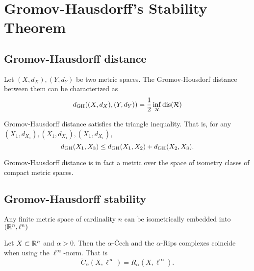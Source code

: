 \chapter{Gromov-Hausdorff's Stability Theorem}

\section{Gromov-Hausdorff distance}

\begin{definition}
    
\end{definition}

\begin{definition}
    
\end{definition}

\begin{proposition}
    Let $ (X, d_X), (Y, d_Y) $ be two metric spaces. The Gromov-Housdorf distance between them can be characterized as
    $$
        d_{\operatorname{GH}}((X, d_X), (Y, d_Y)) = \frac{1}{2} \inf_{\mathcal R} \operatorname{dis}(\mathcal R)
    $$  
\end{proposition}

\begin{lemma}
    Gromov-Hausdorff distance satisfies the triangle inequality. That is, for any $ (X_1, d_{X_1}), (X_1, d_{X_1}), (X_1, d_{X_1}) $,
    $$
        d_{\operatorname{GH}}(X_1, X_3) \leq d_{\operatorname{GH}}(X_1, X_2) + d_{\operatorname{GH}}(X_2, X_3).
    $$
\end{lemma}

\begin{theorem}
    Gromov-Hausdorff distance is in fact a metric over the space of isometry clases of compact metric spaces.    
\end{theorem}

\section{Gromov-Hausdorff stability}
\begin{lemma}
    Any finite metric space of cardinality $ n $ can be isometrically embedded into $(\mathbb R^n, \ell^n)$
\end{lemma}

\begin{lemma}
    Let $ X \subset \mathbb R^n $ and $ \alpha > 0 $. Then the $\alpha$-\v Cech and the $\alpha$-Rips complexes coincide when using the $ \ell^\infty $-norm. That is
    $$
        \check C_\alpha(X, \ell^\infty) = R_\alpha(X, \ell^\infty).
    $$
\end{lemma}

